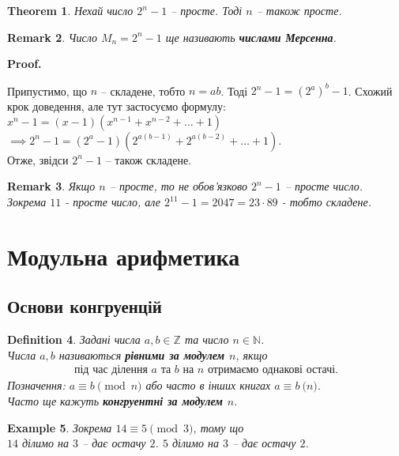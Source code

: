 \documentclass[a4paper, 14pt]{extarticle}
\makeatletter
\theoremstyle{theoremdd}
\newtheorem{theorem}{Theorem}[subsection]
\theoremstyle{theoremdd}
\newtheorem{definition}[theorem]{Definition}
\theoremstyle{theoremdd}
\theoremstyle{theoremdd}
\newtheorem{example}[theorem]{Example}
\theoremstyle{theoremdd}
\theoremstyle{theoremdd}
\newtheorem{remark}[theorem]{Remark}
\theoremstyle{theoremdd}
\theoremstyle{theoremdd}
\def\qed{$\blacksquare$}
\renewenvironment{proof}[1][Proof.\\]{\par
\pushQED{\hfill \qed}%
\normalfont \topsep6\p@\@plus6\p@\relax
\trivlist
\item\relax
{\bfseries
#1\@addpunct{.}}\hspace\labelsep\ignorespaces
}{%
\popQED\endtrivlist\@endpefalse
}
\makeatother
\begin{document}
\begin{theorem}
Нехай число $2^n - 1$ -- просте. Тоді $n$ -- також просте.
\end{theorem}

\begin{remark}
Число $M_n = 2^n - 1$ ще називають \textbf{числами Мерсенна}.
\end{remark}

\begin{proof}
Припустимо, що $n$ -- складене, тобто $n = ab$. Тоді $2^n - 1 = (2^a)^b - 1$. Схожий крок доведення, але тут застосуємо формулу:\\
$x^n - 1 = (x-1)(x^{n-1}+x^{n-2}+\dots + 1)$\\
$\implies 2^n - 1 = (2^a-1)(2^{a(b-1)} + 2^{a(b-2)} + \dots + 1)$.\\
Отже, звідси $2^n-1$ -- також складене.
\end{proof}

\begin{remark}
Якщо $n$ -- просте, то не обов'язково $2^n-1$ -- просте число. Зокрема $11$ - просте число, але $2^{11}-1 = 2047 = 23 \cdot 89$ - тобто складене.
\end{remark}
\newpage

\section{Модульна арифметика}
\subsection{Основи конгруенцій}
\begin{definition}
Задані числа $a,b \in \mathbb{Z}$ та число $n \in \mathbb{N}$.\\
Числа $a,b$ називаються \textbf{рівними за модулем $n$}, якщо
\begin{align*}
\text{під час ділення $a$ та $b$ на $n$ отримаємо однакові остачі.}
\end{align*}
Позначення: $a \equiv b \pmod n$ або часто в інших книгах $a \equiv b \pod n$.\\
Часто ще кажуть \textbf{конгруентні за модулем $n$}.
\end{definition}

\begin{example}
Зокрема $14 \equiv 5 \pmod 3$, тому що\\
$14$ ділимо на $3$ -- дає остачу $2$. \qquad $5$ ділимо на $3$ -- дає остачу $2$.
\end{example}
\end{document}
